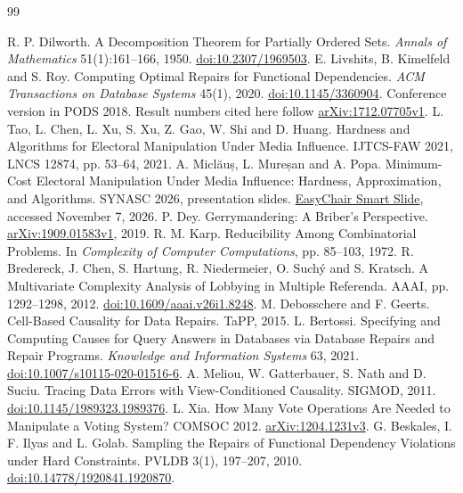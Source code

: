 \documentclass[11pt]{article}
\theoremstyle{remark}
\begin{document}
\begin{thebibliography}{99}
\setlength{\itemsep}{1pt}
\raggedright
{} R. P. Dilworth. A Decomposition Theorem for Partially
Ordered Sets. \emph{Annals of Mathematics} 51(1):161--166, 1950.
\href{https://doi.org/10.2307/1969503}{doi:10.2307/1969503}.
 E. Livshits, B. Kimelfeld and S. Roy. Computing Optimal
Repairs for Functional Dependencies. \emph{ACM Transactions on Database
Systems} 45(1), 2020.
\href{https://doi.org/10.1145/3360904}{doi:10.1145/3360904}. Conference
version in PODS 2018. Result numbers cited here follow
\href{https://arxiv.org/abs/1712.07705v1}{arXiv:1712.07705v1}.
 L. Tao, L. Chen, L. Xu, S. Xu, Z. Gao, W. Shi and D. Huang.
Hardness and Algorithms for Electoral Manipulation Under Media Influence.
IJTCS-FAW 2021, LNCS 12874, pp. 53--64, 2021.
 A. Miclăuș, L. Mureșan and A. Popa. Minimum-Cost
Electoral Manipulation Under Media Influence: Hardness, Approximation, and
Algorithms. SYNASC 2026, presentation slides.
\href{https://easychair.org/smart-slide/slide/TstX}{EasyChair Smart Slide},
accessed November 7, 2026.
 P. Dey. Gerrymandering: A Briber's Perspective.
\href{https://arxiv.org/abs/1909.01583v1}{arXiv:1909.01583v1}, 2019.
 R. M. Karp. Reducibility Among Combinatorial Problems.
In \emph{Complexity of Computer Computations}, pp. 85--103, 1972.
 R. Bredereck, J. Chen, S. Hartung, R. Niedermeier,
O. Such\'{y} and S. Kratsch. A Multivariate Complexity Analysis of Lobbying in
Multiple Referenda. AAAI, pp. 1292--1298, 2012.
\href{https://doi.org/10.1609/aaai.v26i1.8248}{doi:10.1609/aaai.v26i1.8248}.
 M. Debosschere and F. Geerts.
Cell-Based Causality for Data Repairs. TaPP, 2015.
 L. Bertossi. Specifying and Computing Causes for Query
Answers in Databases via Database Repairs and Repair Programs.
\emph{Knowledge and Information Systems} 63, 2021.
\href{https://doi.org/10.1007/s10115-020-01516-6}{doi:10.1007/s10115-020-01516-6}.
 A. Meliou, W. Gatterbauer, S. Nath and D. Suciu.
Tracing Data Errors with View-Conditioned Causality. SIGMOD, 2011.
\href{https://doi.org/10.1145/1989323.1989376}{doi:10.1145/1989323.1989376}.
 L. Xia. How Many Vote Operations Are Needed to Manipulate a
Voting System? COMSOC 2012.
\href{https://arxiv.org/abs/1204.1231v3}{arXiv:1204.1231v3}.
 G. Beskales, I. F. Ilyas and L. Golab. Sampling the Repairs
of Functional Dependency Violations under Hard Constraints. PVLDB 3(1),
197--207, 2010. \href{https://doi.org/10.14778/1920841.1920870}{doi:10.14778/1920841.1920870}.

\end{thebibliography}
\end{document}
